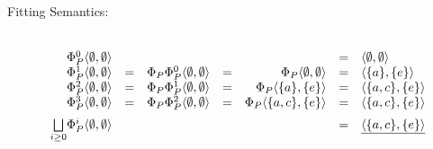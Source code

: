 \begin{Loesung}
\begin{UList}
\begin{description}
 \item[Fitting Semantics:] ~\\
   \(
   \begin{array}[t]{rcrcrcl}
     \Phi^0_P\langle \emptyset,\emptyset\rangle & & & & & = &
     \langle\emptyset,\emptyset\rangle \\
     \Phi^1_P\langle \emptyset,\emptyset\rangle & = & 
     \Phi_P\Phi^0_P\langle \emptyset,\emptyset\rangle & = &
     \Phi_P\langle \emptyset,\emptyset\rangle & = & 
     \langle\{a\},\{e\}\rangle \\
     \Phi^2_P\langle \emptyset,\emptyset\rangle & = & 
     \Phi_P\Phi^1_P\langle \emptyset,\emptyset\rangle & = &
     \Phi_P\langle \{a\},\{e\}\rangle & = & 
     \langle\{a,c\},\{e\}\rangle \\
     \Phi^3_P\langle \emptyset,\emptyset\rangle & = & 
     \Phi_P\Phi^2_P\langle \emptyset,\emptyset\rangle & = &
     \Phi_P\langle \{a,c\},\{e\}\rangle & = & 
     \langle\{a,c\},\{e\}\rangle \\[2mm]
     \underset{i\geq 0}{\bigsqcup}\Phi^i_P\langle \emptyset,\emptyset\rangle 
     & & & & & = & \underline{\langle\{a,c\},\{e\}\rangle}
   \end{array}
   \)


\end{description}
\end{UList}
\end{Loesung}
